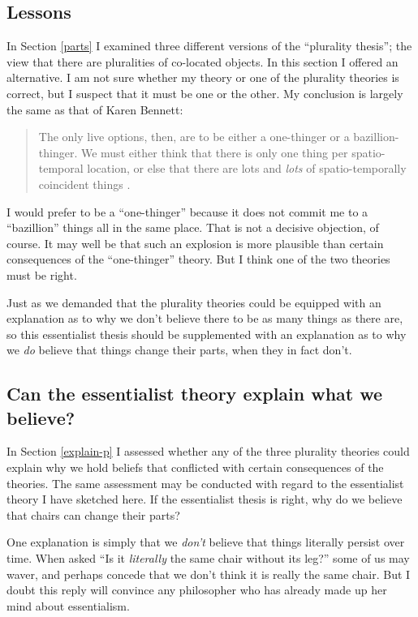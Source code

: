 \documentclass[12pt,twoside]{reedfancy}
\begin{document}
\begin{spacing}{1.25}
\section{Lessons}
\label{lessons-e}
In Section \ref{parts} I examined three different versions of the
``plurality thesis''; the view that there are pluralities of
co-located objects.  In this section I offered an alternative.  I am
not sure whether my theory or one of the plurality theories is
correct, but I suspect that it must be one or the other.  My
conclusion is largely the same as that of Karen Bennett:

\begin{quote}
The only live options, then, are to be either a one-thinger or a
bazillion-thinger.  We must either think that there is only one thing per
spatio-temporal location, or else that there are lots and \emph{lots} of
spatio-temporally coincident things \citeyearpar[358]{bennett2004}.
\end{quote}

I would prefer to be a ``one-thinger'' because it does not commit me
to a ``bazillion'' things all in the same place.  That is not a
decisive objection, of course.  It may well be that such an explosion
is more plausible than certain consequences of the ``one-thinger''
theory.  But I think one of the two theories must be right.

Just as we demanded that the plurality theories could be equipped with
an explanation as to why we don't believe there to be as many things
as there are, so this essentialist thesis should be supplemented with
an explanation as to why we {\em do} believe that things change their
parts, when they in fact don't.

\subsection{Can the essentialist theory explain what we believe?}
\label{explain-e}
In Section \ref{explain-p} I assessed whether any of the three
plurality theories could explain why we hold beliefs that conflicted
with certain consequences of the theories.  The same assessment may be
conducted with regard to the essentialist theory I have sketched here.
If the essentialist thesis is right, why do we believe that chairs can
change their parts?

One explanation is simply that we {\em don't} believe that things
literally persist over time.  When asked ``Is it {\em literally} the
same chair without its leg?'' some of us may waver, and perhaps
concede that we don't think it is really the same chair.  But I doubt
this reply will convince any philosopher who has already made up her
mind about essentialism.


\end{spacing}
\end{document}
